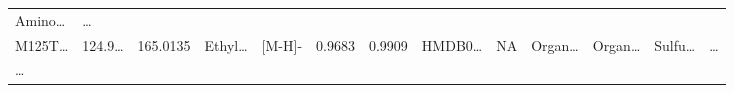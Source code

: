 \documentclass[
]{article}
\begin{document}
\begin{longtable}[]{@{}lllllllllllll@{}}
\begin{minipage}[t]{0.05\columnwidth}
Amino\ldots{}\strut
\end{minipage} & \begin{minipage}[t]{0.02\columnwidth}\raggedright
\ldots{}\strut
\end{minipage}\tabularnewline
\begin{minipage}[t]{0.05\columnwidth}\raggedright
M125T\ldots{}\strut
\end{minipage} & \begin{minipage}[t]{0.05\columnwidth}\raggedright
124.9\ldots{}\strut
\end{minipage} & \begin{minipage}[t]{0.05\columnwidth}\raggedright
165.0135\strut
\end{minipage} & \begin{minipage}[t]{0.05\columnwidth}\raggedright
Ethyl\ldots{}\strut
\end{minipage} & \begin{minipage}[t]{0.05\columnwidth}\raggedright
{[}M-H{]}-\strut
\end{minipage} & \begin{minipage}[t]{0.07\columnwidth}\raggedright
0.9683\strut
\end{minipage} & \begin{minipage}[t]{0.07\columnwidth}\raggedright
0.9909\strut
\end{minipage} & \begin{minipage}[t]{0.05\columnwidth}\raggedright
HMDB0\ldots{}\strut
\end{minipage} & \begin{minipage}[t]{0.04\columnwidth}\raggedright
NA\strut
\end{minipage} & \begin{minipage}[t]{0.05\columnwidth}\raggedright
Organ\ldots{}\strut
\end{minipage} & \begin{minipage}[t]{0.05\columnwidth}\raggedright
Organ\ldots{}\strut
\end{minipage} & \begin{minipage}[t]{0.05\columnwidth}\raggedright
Sulfu\ldots{}\strut
\end{minipage} & \begin{minipage}[t]{0.02\columnwidth}\raggedright
\ldots{}\strut
\end{minipage}\tabularnewline
\begin{minipage}[t]{0.05\columnwidth}\raggedright
\ldots{}\strut
\end{minipage} & \begin{minipage}[t]{0.05\columnwidth}\raggedright

\end{minipage}
\end{longtable}
\end{document}
